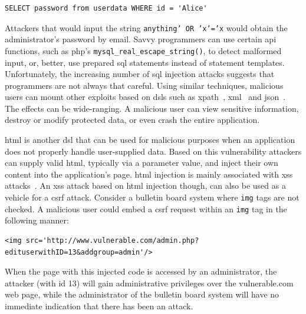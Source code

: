 \documentclass[conference]{IEEEtran}
\begin{document}
\lstset{language=SQL}
\begin{lstlisting}
SELECT password from userdata WHERE id = 'Alice'
\end{lstlisting}

\noindent
Attackers that would input the string {\tt anything' OR 'x'='x}
would obtain the administrator's password by email. Savvy
programmers can use certain {\sc api} functions, such as {\sc php}'s
{\tt mysql\_real\_escape\_string()}, to detect malformed input, or,
better, use prepared {\sc sql} statements instead of statement
templates. Unfortunately, the increasing number of {\sc sql} injection
attacks suggests that programmers are not always that careful. Using
similar techniques, malicious users can mount other exploits based on
{\sc dsl}s such as {\sc xp}ath~\cite{SW06,CDL07,MKS09}, {\sc
  xml}~\cite{MSM13} and {\sc json}~\cite{SMS13}. The effects can be
wide-ranging. A malicious user can view sensitive information, destroy
or modify protected data, or even crash the entire application.

{\sc html} is another {\sc dsl} that can be used for malicious
purposes when an application does not properly handle user-supplied
data. Based on this vulnerability attackers can supply valid {\sc
  html}, typically via a parameter value, and inject their own content
into the application's page. {\sc html} injection is mainly associated with {\sc
  xss} attacks~\cite{BJM08,LZRL09}. An {\sc xss} attack based on
{\sc html} injection though, can also be used as a
vehicle for a {\sc csrf} attack. Consider a bulletin board system where
{\tt img} tags are not checked. A malicious user could embed a {\sc
  csrf} request within an {\tt img} tag in the following manner:

\lstset{language=HTML}
\begin{lstlisting}
<img src='http://www.vulnerable.com/admin.php?edituserwithID=13&addgroup=admin'/>
\end{lstlisting}

\noindent
When the page with this injected code is accessed by an administrator,
the attacker (with {\sc id} 13) will gain administrative privileges
over the vulnerable.com web page,
while the administrator of the bulletin board system
will have no immediate indication that there has been an attack.
\end{document}
